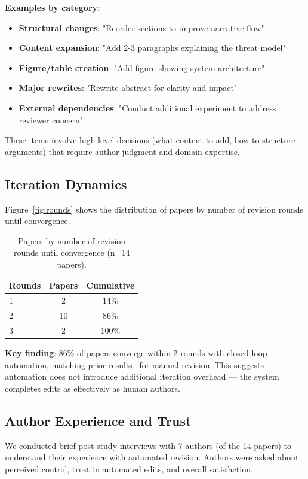 \textbf{Examples by category}:
\begin{itemize}
\item \textbf{Structural changes}: "Reorder sections to improve narrative flow"
\item \textbf{Content expansion}: "Add 2-3 paragraphs explaining the threat model"
\item \textbf{Figure/table creation}: "Add figure showing system architecture"
\item \textbf{Major rewrites}: "Rewrite abstract for clarity and impact"
\item \textbf{External dependencies}: "Conduct additional experiment to address reviewer concern"
\end{itemize}

These items involve high-level decisions (what content to add, how to structure arguments) that require author judgment and domain expertise.

\subsection{Iteration Dynamics}

Figure~\ref{fig:rounds} shows the distribution of papers by number of revision rounds until convergence.

\begin{table}[t]
\centering
\caption{Papers by number of revision rounds until convergence (n=14 papers).}
\label{tab:rounds}
\begin{tabular}{lcc}
\toprule
Rounds & Papers & Cumulative \\
\midrule
1 & 2 & 14\% \\
2 & 10 & 86\% \\
3 & 2 & 100\% \\
\bottomrule
\end{tabular}
\end{table}

\textbf{Key finding}: 86\% of papers converge within 2 rounds with closed-loop automation, matching prior results~\cite{dellalibera2026dynamics} for manual revision. This suggests automation does not introduce additional iteration overhead — the system completes edits as effectively as human authors.

\subsection{Author Experience and Trust}

We conducted brief post-study interviews with 7 authors (of the 14 papers) to understand their experience with automated revision. Authors were asked about: perceived control, trust in automated edits, and overall satisfaction.

